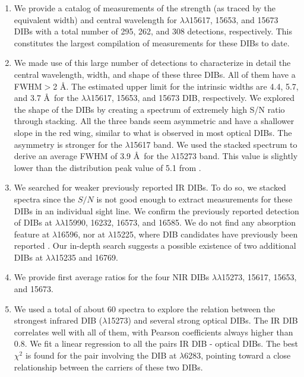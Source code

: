 \documentclass[printer]{aa} %
\begin{document}
\begin{enumerate}

\item We provide a catalog of measurements of the strength (as traced by the equivalent width) and central wavelength for $\lambda\lambda$15617, 15653, and 15673 DIBs with a total number of 295, 262, and 308 detections, respectively. This constitutes the largest compilation  of measurements for these DIBs to date.

\item We made use of this large number of detections to characterize in detail the central wavelength, width, and shape of these three DIBs. All of them have a FWHM$>$2 \AA. The estimated upper limit for the intrinsic widths are 4.4, 5.7, and 3.7 \AA\ for the $\lambda\lambda$15617, 15653, and 15673 DIB, respectively. We explored the shape of the DIBs by creating a spectrum of extremely high S/N ratio through stacking. All the three bands seem asymmetric and have a shallower slope in the red wing, similar to what is observed in most optical DIBs. The asymmetry is stronger for the  $\lambda$15617 band. We used the stacked spectrum to derive an average FWHM of 3.9 \AA\ for the $\lambda$15273 band. This value is slightly lower than the distribution peak value of 5.1 from \cite{Zasowski15}. 

\item We searched for weaker previously reported IR DIBs. To do so, we stacked spectra since the $S/N$ is not good enough to extract measurements for these DIBs in an individual sight line. We confirm the previously reported detection of DIBs at $\lambda\lambda$15990, 16232, 16573, and 16585. We do not find any absorption feature at $\lambda$16596, nor at $\lambda$15225, where DIB candidates have previously been reported \citep{Geballe11}. Our in-depth search suggests a possible existence of two additional DIBs at $\lambda\lambda$15235 and 16769.
\item We provide first average ratios for the four NIR DIBs $\lambda\lambda$15273, 15617, 15653, and 15673.

\item We used a total of about 60 spectra to explore the relation between the strongest infrared DIB ($\lambda$15273) and several strong optical DIBs. The IR DIB correlates well with all of them, with Pearson coefficients always higher than 0.8. We fit a linear regression to all the pairs IR DIB - optical DIBs. The best $\chi^2$ is found for the pair involving the DIB at $\lambda$6283, pointing toward a close relationship between the carriers of these two DIBs.


\end{enumerate}
\end{document}
